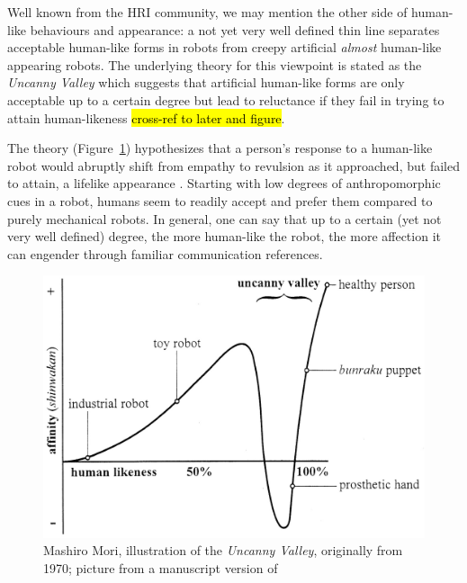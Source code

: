 \documentclass{frontiersSCNS} %
\begin{document}
Well known from the HRI community, we may mention the other side of human-like
behaviours and appearance: a not yet very well defined thin line separates
acceptable human-like forms in robots from creepy artificial \textit{almost}
human-like appearing robots. The underlying theory for this viewpoint is stated
as the \textit{Uncanny Valley} \cite{mori_uncanny_1970} which suggests that
artificial human-like forms are only acceptable up to a certain degree but lead
to reluctance if they fail in trying to attain human-likeness \hl{cross-ref to
later and figure}.

The theory (Figure~\ref{fig:uncanny_valley}) hypothesizes that a person's
response to a human-like robot would abruptly shift from empathy to revulsion as
it approached, but failed to attain, a lifelike appearance
\cite{mori_uncanny_1970}. Starting with low degrees of anthropomorphic cues in a
robot, humans seem to readily accept and prefer them compared to purely
mechanical robots. In general, one can say that up to a certain (yet not very
well defined) degree, the more human-like the robot, the more affection it can
engender through familiar communication references.


\begin{figure}\centering
  \includegraphics[scale=0.6]{uncanny-valley.jpg}
 \caption{Mashiro Mori, illustration of the \textit{Uncanny Valley}, originally
 from 1970; picture from a manuscript version of \cite{mori_uncanny_2012}}

 \label{fig:uncanny_valley}       %
 \end{figure}
\end{document}
